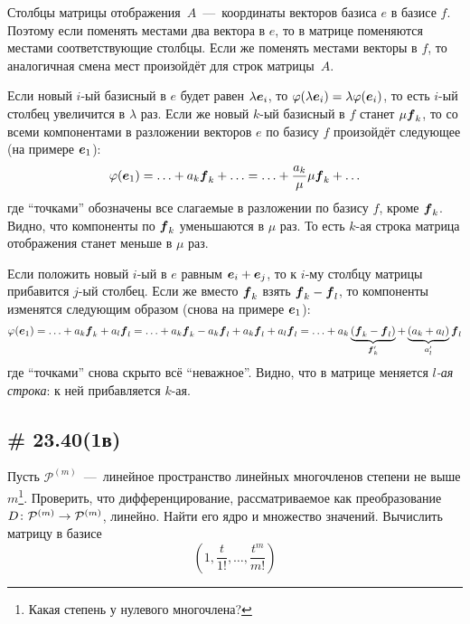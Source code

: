 \documentclass[a4paper,12pt]{article}
\begin{document}
  \begin{solution}
    Столбцы матрицы отображения~$A$~---~координаты векторов базиса $e$ в базисе $f$.
    Поэтому если поменять местами два вектора в $e$, то в матрице поменяются местами соответствующие столбцы.
    Если же поменять местами векторы в $f$, то аналогичная смена мест произойдёт для строк матрицы~$A$.
    
    Если новый $i$-ый базисный в $e$ будет равен $\lambda \boldsymbol e_i$, то $\phi(\lambda \bds e_i) \hm= \lambda \phi(\bds e_i)$, то есть $i$-ый столбец увеличится в $\lambda$ раз.
    Если же новый $k$-ый базисный в $f$ станет $\mu \boldsymbol f_k$, то со всеми компонентами в разложении векторов $e$ по базису $f$ произойдёт следующее (на примере $\boldsymbol e_1$):
    \[
      \varphi(\boldsymbol e_1) = \ldots + a_k \boldsymbol f_k + \ldots = \ldots + \frac{a_k}{\mu} \mu \boldsymbol f_k + \ldots
    \]
    где ``точками'' обозначены все слагаемые в разложении по базису $f$, кроме $\boldsymbol f_k$.
    Видно, что компоненты по $\boldsymbol f_k$ уменьшаются в $\mu$ раз.
    То есть $k$-ая строка матрица отображения станет меньше в $\mu$ раз.
    
    Если положить новый $i$-ый в $e$ равным $\bds e_i \hm+ \bds e_j$, то к $i$-му столбцу матрицы прибавится $j$-ый столбец.
    Если же вместо $\boldsymbol f_k$ взять $\bds f_k \hm- \bds f_l$, то компоненты изменятся следующим образом (снова на примере $\boldsymbol e_1$):
    \[
      \varphi(\boldsymbol e_1)
      = \ldots + a_k \boldsymbol f_k + a_l \boldsymbol f_l
      = \ldots + a_k \boldsymbol f_k - a_k \boldsymbol f_l + a_k \boldsymbol f_l +  a_l \boldsymbol f_l
      = \ldots + a_k \underbrace{(\boldsymbol f_k - \boldsymbol f_l)}_{\boldsymbol f'_k} + \underbrace{(a_k + a_l)}_{a'_l} \boldsymbol f_l
    \]
    где ``точками'' снова скрыто всё ``неважное''.
    Видно, что в матрице меняется \emph{$l$-ая строка}: к ней прибавляется $k$-ая.
  \end{solution}
  
  
  \subsection{\# 23.40(1в)}
  
  Пусть $\mathcal P^{(m)}$~---~линейное пространство линейных многочленов степени не выше $m$\footnote{Какая степень у нулевого многочлена?}.
  Проверить, что дифференцирование, рассматриваемое как преобразование $D\colon \mathcal P^{(m)} \hm\to \mathcal P^{(m)}$, линейно.
  Найти его ядро и множество значений.
  Вычислить матрицу в базисе
  \[
    \left(1, \frac{t}{1!}, \ldots, \frac{t^m}{m!}\right)
  \]
  
\end{document}
